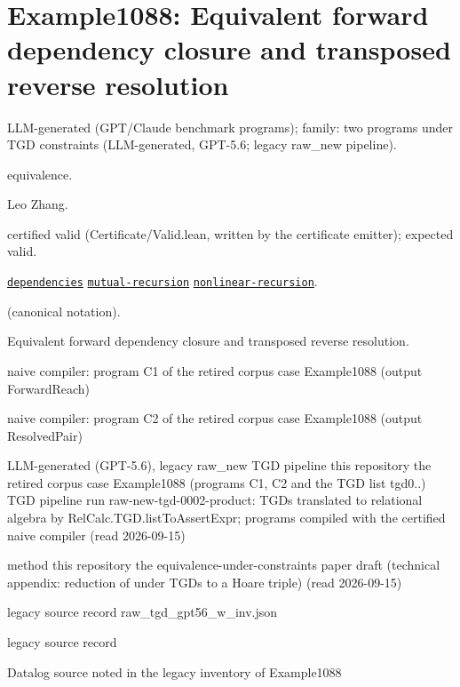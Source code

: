 \documentclass[10pt]{article}
\begin{document}
\section{Example1088: Equivalent forward dependency closure and transposed reverse resolution}\label{case:Example1088}

\begin{description}[leftmargin=2.6cm,style=nextline,itemsep=1pt]

\item[Category] LLM-generated (GPT/Claude benchmark programs); family: two programs under TGD constraints (LLM-generated, GPT-5.6; legacy raw\_new pipeline).

\item[Kind] equivalence.

\item[Contributors] Leo Zhang.

\item[Status] certified valid (Certificate/Valid.lean, written by the certificate emitter); expected valid.

\item[Tags] \hyperref[tag:dependencies]{\texttt{dependencies}} \hyperref[tag:mutual-recursion]{\texttt{mutual-recursion}} \hyperref[tag:nonlinear-recursion]{\texttt{nonlinear-recursion}}.

\item[Input]  (canonical notation).

\item[Summary] Equivalent forward dependency closure and transposed reverse resolution.

\item[Sides] naive compiler: program C1 of the retired corpus case Example1088 (output ForwardReach) \par naive compiler: program C2 of the retired corpus case Example1088 (output ResolvedPair)

\item[Sources] {\raggedright LLM-generated (GPT-5.6), legacy raw\_new TGD pipeline this repository the retired corpus case Example1088 (programs C1, C2 and the TGD list tgd0..) TGD pipeline run raw-new-tgd-0002-product: TGDs translated to relational algebra by RelCalc.TGD.listToAssertExpr; programs compiled with the certified naive compiler (read 2026-09-15) \par method this repository the equivalence-under-constraints paper draft (technical appendix: reduction of  under TGDs to a Hoare triple) (read 2026-09-15) \par legacy source record raw\_tgd\_gpt56\_w\_inv.json \par legacy source record  \par Datalog source noted in the legacy inventory of Example1088\par}


\end{description}
\end{document}
